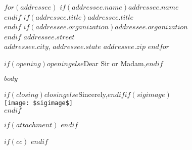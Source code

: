 \documentclass[
    UScommercial9, %
    page=letter, %
    pagesize, %
    fromalign=right, %
    fromrule=false, %
    foldmarks=$if(foldmarks)$$foldmarks$$else$false$endif$, %
    parskip=half,
    version=last
    ]{scrlttr2}
\date{\today} %
\begin{document}
 
\begin{letter}{$for(addressee)$
    $if(addressee.name)$$addressee.name$ \\$endif$
    $if(addressee.title)$$addressee.title$ \\$endif$
    $if(addressee.organization)$$addressee.organization$ \\$endif$
    $addressee.street$ \\ $addressee.city$, $addressee.state$ $addressee.zip$
$endfor$} %


\opening{$if(opening)$$opening$$else$Dear Sir or Madam,$endif$}

$body$

\closing{$if(closing)$$closing$$else$Sincerely,$endif$$if(sigimage)$ \\ \texttt{[image: \$sigimage\$]}\\$endif$}

$if(attachment)$ %
$endif$

$if(cc)$ %
$endif$


\end{letter}
 
\end{document}
